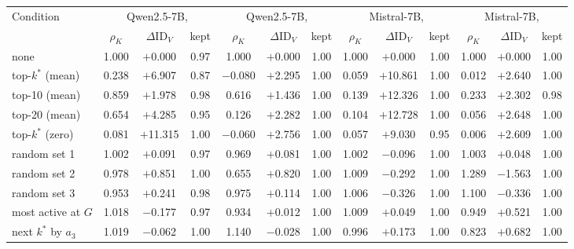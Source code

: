 \begin{tabular}{@{}lcccccccccccc@{}}
\toprule
Condition & \multicolumn{3}{c}{Qwen2.5-7B, \fmtOpt{}} & \multicolumn{3}{c}{Qwen2.5-7B, \fmtPost{}} & \multicolumn{3}{c}{Mistral-7B, \fmtOpt{}} & \multicolumn{3}{c}{Mistral-7B, \fmtPost{}} \\
\cmidrule(lr){2-4}\cmidrule(lr){5-7}\cmidrule(lr){8-10}\cmidrule(lr){11-13}
 & $\rho_K$ & $\Delta\mathrm{ID}_V$ & kept & $\rho_K$ & $\Delta\mathrm{ID}_V$ & kept & $\rho_K$ & $\Delta\mathrm{ID}_V$ & kept & $\rho_K$ & $\Delta\mathrm{ID}_V$ & kept \\
\midrule
none & 1.000 & $+$0.000 & 0.97 & 1.000 & $+$0.000 & 1.00 & 1.000 & $+$0.000 & 1.00 & 1.000 & $+$0.000 & 1.00 \\
top-$k^*$ (mean) & 0.238 & $+$6.907 & 0.87 & $-$0.080 & $+$2.295 & 1.00 & 0.059 & $+$10.861 & 1.00 & 0.012 & $+$2.640 & 1.00 \\
top-10 (mean) & 0.859 & $+$1.978 & 0.98 & 0.616 & $+$1.436 & 1.00 & 0.139 & $+$12.326 & 1.00 & 0.233 & $+$2.302 & 0.98 \\
top-20 (mean) & 0.654 & $+$4.285 & 0.95 & 0.126 & $+$2.282 & 1.00 & 0.104 & $+$12.728 & 1.00 & 0.056 & $+$2.648 & 1.00 \\
top-$k^*$ (zero) & 0.081 & $+$11.315 & 1.00 & $-$0.060 & $+$2.756 & 1.00 & 0.057 & $+$9.030 & 0.95 & 0.006 & $+$2.609 & 1.00 \\
random set 1 & 1.002 & $+$0.091 & 0.97 & 0.969 & $+$0.081 & 1.00 & 1.002 & $-$0.096 & 1.00 & 1.003 & $+$0.048 & 1.00 \\
random set 2 & 0.978 & $+$0.851 & 1.00 & 0.655 & $+$0.820 & 1.00 & 1.009 & $-$0.292 & 1.00 & 1.289 & $-$1.563 & 1.00 \\
random set 3 & 0.953 & $+$0.241 & 0.98 & 0.975 & $+$0.114 & 1.00 & 1.006 & $-$0.326 & 1.00 & 1.100 & $-$0.336 & 1.00 \\
most active at $G$ & 1.018 & $-$0.177 & 0.97 & 0.934 & $+$0.012 & 1.00 & 1.009 & $+$0.049 & 1.00 & 0.949 & $+$0.521 & 1.00 \\
next $k^*$ by $a_3$ & 1.019 & $-$0.062 & 1.00 & 1.140 & $-$0.028 & 1.00 & 0.996 & $+$0.173 & 1.00 & 0.823 & $+$0.682 & 1.00 \\
\bottomrule
\end{tabular}

